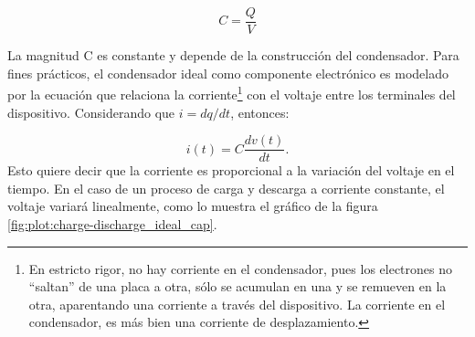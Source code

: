 \begin{equation}
	C = \frac{Q}{V}
\end{equation}

La magnitud C es constante y depende de la construcción del condensador. Para fines prácticos, el condensador ideal como componente electrónico es modelado por la ecuación que relaciona la corriente\footnote{En estricto rigor, no hay corriente en el condensador, pues los electrones no ``saltan'' de una placa a otra, sólo se acumulan en una y se remueven en la otra, aparentando una corriente a través del dispositivo. La corriente en el condensador, es más bien una corriente de desplazamiento.} con el voltaje entre los terminales del dispositivo. Considerando que $i = dq/dt$, entonces:

\begin{equation}
	i(t) = C \frac{dv(t)}{dt}.
\end{equation}
Esto quiere decir que la corriente es proporcional a la variación del voltaje en el tiempo.
En el caso de un proceso de carga y descarga a corriente constante, el voltaje variará linealmente, como lo muestra el gráfico de la figura \ref{fig:plot:charge-discharge_ideal_cap}.

